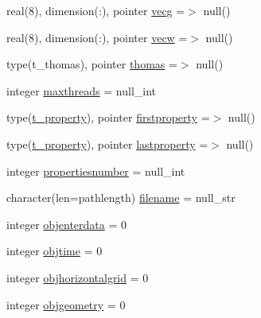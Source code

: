 \begin{DoxyCompactItemize}
\item 
real(8), dimension(\+:), pointer \mbox{\hyperlink{structmodulefreeverticalmovement_1_1t__freeverticalmovement_ad8c3ae94c1109d459b52673826a3104a}{vecg}} =$>$ null()
\item 
real(8), dimension(\+:), pointer \mbox{\hyperlink{structmodulefreeverticalmovement_1_1t__freeverticalmovement_a17162524ee866c6b264929db8314f7a2}{vecw}} =$>$ null()
\item 
type(t\+\_\+thomas), pointer \mbox{\hyperlink{structmodulefreeverticalmovement_1_1t__freeverticalmovement_a7328ef0c236d95b0c683bd077c665b08}{thomas}} =$>$ null()
\item 
integer \mbox{\hyperlink{structmodulefreeverticalmovement_1_1t__freeverticalmovement_a4b1482b08af0cfc19be0cafe8a78acf7}{maxthreads}} = null\+\_\+int
\item 
type(\mbox{\hyperlink{structmodulefreeverticalmovement_1_1t__property}{t\+\_\+property}}), pointer \mbox{\hyperlink{structmodulefreeverticalmovement_1_1t__freeverticalmovement_ae5c3e8b6866f1cbf6e14b8f288dc0c8b}{firstproperty}} =$>$ null()
\item 
type(\mbox{\hyperlink{structmodulefreeverticalmovement_1_1t__property}{t\+\_\+property}}), pointer \mbox{\hyperlink{structmodulefreeverticalmovement_1_1t__freeverticalmovement_a6c8961a01f46aef25398ea79cf52db87}{lastproperty}} =$>$ null()
\item 
integer \mbox{\hyperlink{structmodulefreeverticalmovement_1_1t__freeverticalmovement_a268e420f9a2cc53d5ff2062a25ecedf1}{propertiesnumber}} = null\+\_\+int
\item 
character(len=pathlength) \mbox{\hyperlink{structmodulefreeverticalmovement_1_1t__freeverticalmovement_af0cce68f3eda940f38428e765bbb4af3}{filename}} = null\+\_\+str
\item 
integer \mbox{\hyperlink{structmodulefreeverticalmovement_1_1t__freeverticalmovement_ae7e54d4ef909eba99cb8c0a2dfe76abc}{objenterdata}} = 0
\item 
integer \mbox{\hyperlink{structmodulefreeverticalmovement_1_1t__freeverticalmovement_a57a4e3d6f46808e79f0fe1c149bdc5e0}{objtime}} = 0
\item 
integer \mbox{\hyperlink{structmodulefreeverticalmovement_1_1t__freeverticalmovement_ab4fd6672873d36eaacffb539110151a9}{objhorizontalgrid}} = 0
\item 
integer \mbox{\hyperlink{structmodulefreeverticalmovement_1_1t__freeverticalmovement_a1e848b5f018b19184c292aee982d2b5f}{objgeometry}} = 0
\item 

\end{DoxyCompactItemize}
